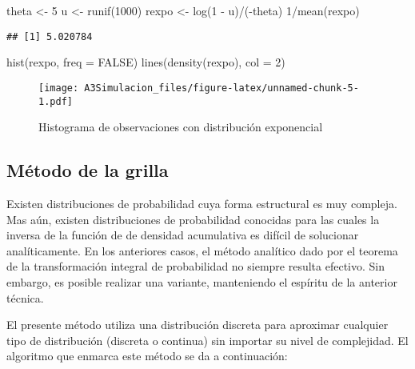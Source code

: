 \documentclass[
  12pt,
  spanish,
]{book}
\newenvironment{Shaded}{\begin{snugshade}}{\end{snugshade}}
\newcommand{\AttributeTok}[1]{\textcolor[rgb]{0.77,0.63,0.00}{#1}}
\newcommand{\ConstantTok}[1]{\textcolor[rgb]{0.00,0.00,0.00}{#1}}
\newcommand{\DecValTok}[1]{\textcolor[rgb]{0.00,0.00,0.81}{#1}}
\newcommand{\FunctionTok}[1]{\textcolor[rgb]{0.00,0.00,0.00}{#1}}
\newcommand{\NormalTok}[1]{#1}
\newcommand{\OtherTok}[1]{\textcolor[rgb]{0.56,0.35,0.01}{#1}}
\newcommand{\SpecialCharTok}[1]{\textcolor[rgb]{0.00,0.00,0.00}{#1}}
\theoremstyle{definition}
\theoremstyle{definition}
\theoremstyle{definition}
\theoremstyle{definition}
\theoremstyle{remark}
\begin{document}
\begin{Shaded}
\begin{Highlighting}[]
\NormalTok{theta }\OtherTok{\textless{}{-}} \DecValTok{5}
\NormalTok{u }\OtherTok{\textless{}{-}} \FunctionTok{runif}\NormalTok{(}\DecValTok{1000}\NormalTok{)}
\NormalTok{rexpo }\OtherTok{\textless{}{-}} \FunctionTok{log}\NormalTok{(}\DecValTok{1} \SpecialCharTok{{-}}\NormalTok{ u)}\SpecialCharTok{/}\NormalTok{(}\SpecialCharTok{{-}}\NormalTok{theta)}
\DecValTok{1}\SpecialCharTok{/}\FunctionTok{mean}\NormalTok{(rexpo)}
\end{Highlighting}
\end{Shaded}

\begin{verbatim}
## [1] 5.020784
\end{verbatim}

\begin{Shaded}
\begin{Highlighting}[]
\FunctionTok{hist}\NormalTok{(rexpo, }\AttributeTok{freq =} \ConstantTok{FALSE}\NormalTok{)}
\FunctionTok{lines}\NormalTok{(}\FunctionTok{density}\NormalTok{(rexpo), }\AttributeTok{col =} \DecValTok{2}\NormalTok{)}
\end{Highlighting}
\end{Shaded}

\begin{figure}
\centering
\texttt{[image: A3Simulacion\_files/figure-latex/unnamed-chunk-5-1.pdf]}
\caption{\label{fig:unnamed-chunk-5}Histograma de observaciones con distribución exponencial}
\end{figure}

\hypertarget{muxe9todo-de-la-grilla}{%
\subsection{Método de la grilla}\label{muxe9todo-de-la-grilla}}

Existen distribuciones de probabilidad cuya forma estructural es muy compleja. Mas aún, existen distribuciones de probabilidad conocidas para las cuales la inversa de la función de de densidad acumulativa es difícil de solucionar analíticamente. En los anteriores casos, el método analítico dado por el teorema de la transformación integral de probabilidad no siempre resulta efectivo. Sin embargo, es posible realizar una variante, manteniendo el espíritu de la anterior técnica.

El presente método utiliza una distribución discreta para aproximar cualquier tipo de distribución (discreta o continua) sin importar su nivel de complejidad. El algoritmo que enmarca este método se da a continuación:
\end{document}
